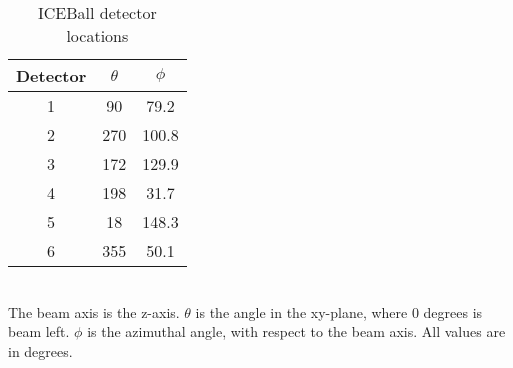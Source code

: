 \begin{table}[]
    \centering
    \caption{ICEBall detector locations}
        \label{tab:ICE_Det_Loc}
    \begin{tabular}{c|c|c} \toprule
         Detector & $\theta$ & $\phi$  \\
         \hline
         1 & 90 & 79.2 \\ 
         2 & 270 & 100.8\\
         3 & 172 & 129.9\\
         4 & 198 & 31.7\\
         5 & 18 & 148.3\\
         6 & 355 & 50.1\\ \bottomrule
    \end{tabular}
    \\[2]
    \footnotesize
    The beam axis is the z-axis. $\theta$ is the angle in the xy-plane, where 0 degrees is beam left. $\phi$ is the azimuthal angle, with respect to the beam axis. All values are in degrees.
\end{table}